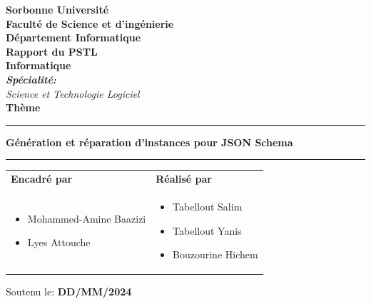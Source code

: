\begin{titlepage}
\begin{center}
{\bf {\large Sorbonne Université}}\\
{\bf Faculté de Science et d'ingénierie} \\
{ \textbf{D\'epartement Informatique}}\\ \vspace{0.5cm}
\Huge{\textbf{Rapport du PSTL}} \\ \Large{\textbf{Informatique}} \\\vspace{0.3cm}
\large{\emph{\textbf{Spécialité:} \\ Science et Technologie Logiciel}}\\ \vspace{0.5cm}
\huge{\textbf{Thème}}\\ %
\noindent\rule{\textwidth}{1mm}
\Large{\textbf{Génération et réparation d’instances
pour JSON Schema
}}
\noindent\rule{\textwidth}{1mm}
\end{center}
\vspace{0.3cm}
\begin{tabular}{ p{9cm}  p{6cm} }
        \textbf{Encadré par} & \textbf{Réalisé par} \\
        \begin{itemize}
        	\item[\textbullet] { Mohammed-Amine Baazizi }
        	\newline
        	\item[\textbullet] { Lyes Attouche }
        \end{itemize}
        &
        \begin{itemize}
        	\item[\textbullet]{Tabellout Salim}
        	\newline
        	\item[\textbullet]{Tabellout Yanis}
            \newline
        	\item[\textbullet]{Bouzourine Hichem}
        \end{itemize}
\end{tabular}


\begin{center}



Soutenu le: \textbf{DD/MM/2024}
\\ 


\end{center}

\end{titlepage}